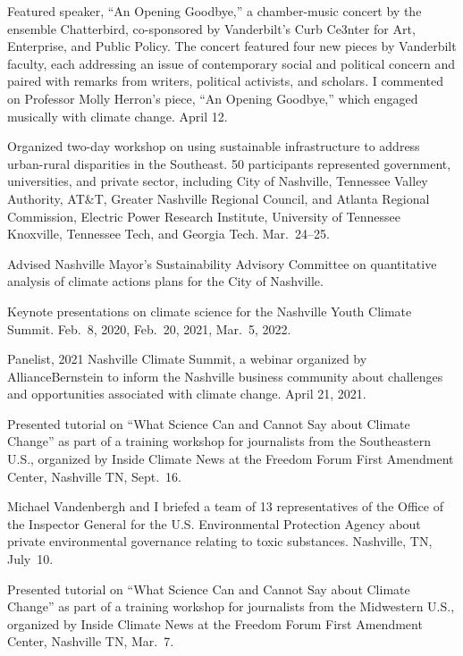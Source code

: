 \item[2023] Featured speaker, ``An Opening Goodbye,'' a chamber-music concert
  by the ensemble Chatterbird, co-sponsored by Vanderbilt's Curb Ce3nter for
  Art, Enterprise, and Public Policy. The concert featured four new pieces by
  Vanderbilt faculty, each addressing an issue of contemporary social and political
  concern and paired with remarks from writers, political activists, and scholars.
  I commented on Professor Molly Herron's piece, ``An Opening Goodbye,''
  which engaged musically with climate change.  April 12.
\item[2022] Organized two-day workshop on using sustainable infrastructure to
  address urban-rural disparities in the Southeast. 50 participants represented
  government, universities, and private sector, including City of Nashville,
  Tennessee Valley Authority, AT\&T, Greater Nashville Regional Council,
  and Atlanta Regional Commission, Electric Power Research Institute,
  University of Tennessee Knoxville, Tennessee Tech, and Georgia Tech.
  Mar.~24--25.
\item[2020--2022] Advised Nashville Mayor's Sustainability Advisory
Committee on quantitative analysis of climate actions plans for the City of
Nashville.
\item[2020--2022] Keynote presentations on climate science for the Nashville
Youth Climate Summit. Feb.~8, 2020, Feb.~20, 2021, Mar.~5, 2022.
\item[2021] Panelist, 2021 Nashville Climate Summit, a webinar organized by
 AllianceBernstein to inform the Nashville business community about
 challenges and opportunities associated with climate change. April 21, 2021.
\item[2019] Presented tutorial on ``What Science Can and Cannot Say about
  Climate Change'' as part of a training workshop for journalists from the
  Southeastern U.S., organized by Inside Climate News at the Freedom Forum
  First Amendment Center, Nashville TN, Sept.~16.
\item[2019] Michael Vandenbergh and I briefed a team of 13 representatives of
  the Office of the Inspector General for the U.S. Environmental Protection
  Agency about private environmental governance relating to toxic substances.
  Nashville, TN, July~10.
\item[2019] Presented tutorial on ``What Science Can and Cannot Say about
  Climate Change'' as part of a training workshop for journalists from the
  Midwestern U.S., organized by Inside Climate News at the Freedom Forum First
  Amendment Center, Nashville TN, Mar.~7.
